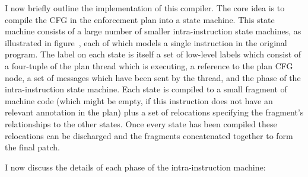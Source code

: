 I now briefly outline the implementation of this compiler.
The core idea is to compile the CFG in the enforcement plan into a state machine.
This state machine consists of a large number of smaller intra-instruction state machines, as illustrated in figure~, each of which models a single instruction in the original program.
The label on each state is itself a set of low-level labels which consist of a four-tuple of the plan thread which is executing, a reference to the plan CFG node, a set of messages which have been sent by the thread, and the phase of the intra-instruction state machine.
Each state is compiled to a small fragment of machine code (which might be empty, if this instruction does not have an relevant annotation in the plan) plus a set of relocations specifying the fragment's relationships to the other states.
Once every state has been compiled these relocations can be discharged and the fragments concatenated together to form the final patch.

I now discuss the details of each phase of the intra-instruction machine:

